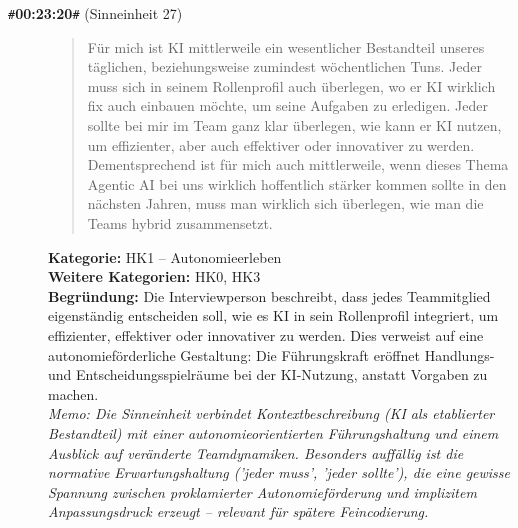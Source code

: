 \begin{description}
  \item[\texttt{\#}\textbf{00:23:20}\texttt{\#} (Sinneinheit 27)]
  \begin{quote}
  Für mich ist KI mittlerweile ein wesentlicher Bestandteil unseres täglichen, beziehungsweise zumindest wöchentlichen Tuns. Jeder muss sich in seinem Rollenprofil auch überlegen, wo er KI wirklich fix auch einbauen möchte, um seine Aufgaben zu erledigen. Jeder sollte bei mir im Team ganz klar überlegen, wie kann er KI nutzen, um effizienter, aber auch effektiver oder innovativer zu werden. Dementsprechend ist für mich auch mittlerweile, wenn dieses Thema Agentic AI bei uns wirklich hoffentlich stärker kommen sollte in den nächsten Jahren, muss man wirklich sich überlegen, wie man die Teams hybrid zusammensetzt.
  \end{quote}
  \textbf{Kategorie:} HK1 -- Autonomieerleben\\
  \textbf{Weitere Kategorien:} HK0, HK3\\
  \textbf{Begr\"undung:} Die Interviewperson beschreibt, dass jedes Teammitglied eigenständig entscheiden soll, wie es KI in sein Rollenprofil integriert, um effizienter, effektiver oder innovativer zu werden. Dies verweist auf eine autonomieförderliche Gestaltung: Die Führungskraft eröffnet Handlungs- und Entscheidungsspielräume bei der KI-Nutzung, anstatt Vorgaben zu machen.
  \\\textit{Memo: Die Sinneinheit verbindet Kontextbeschreibung (KI als etablierter Bestandteil) mit einer autonomieorientierten Führungshaltung und einem Ausblick auf veränderte Teamdynamiken. Besonders auffällig ist die normative Erwartungshaltung ('jeder muss', 'jeder sollte'), die eine gewisse Spannung zwischen proklamierter Autonomieförderung und implizitem Anpassungsdruck erzeugt – relevant für spätere Feincodierung.}
\end{description}
\medskip

